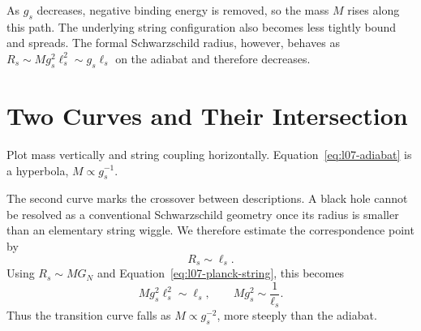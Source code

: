 As \(g_s\) decreases, negative binding energy is removed, so the mass \(M\) rises along this path. The underlying string configuration also becomes less tightly bound and spreads. The formal Schwarzschild radius, however, behaves as \(R_s\sim Mg_s^2\ell_s^2\sim g_s\ell_s\) on the adiabat and therefore decreases.

\begin{classroomqa}
\end{classroomqa}

\section{Two Curves and Their Intersection}

Plot mass vertically and string coupling horizontally. Equation~\eqref{eq:l07-adiabat} is a hyperbola, \(M\propto g_s^{-1}\).

\begin{classroomqa}
\end{classroomqa}

The second curve marks the crossover between descriptions. A black hole cannot be resolved as a conventional Schwarzschild geometry once its radius is smaller than an elementary string wiggle. We therefore estimate the correspondence point by
\begin{equation}
R_s\sim\ell_s.
\label{eq:l07-correspondence-radius}
\end{equation}
Using \(R_s\sim MG_N\) and Equation~\eqref{eq:l07-planck-string}, this becomes
\begin{equation}
Mg_s^2\ell_s^2\sim\ell_s,
\qquad
Mg_s^2\sim\frac{1}{\ell_s}.
\label{eq:l07-transition-curve}
\end{equation}
Thus the transition curve falls as \(M\propto g_s^{-2}\), more steeply than the adiabat.

